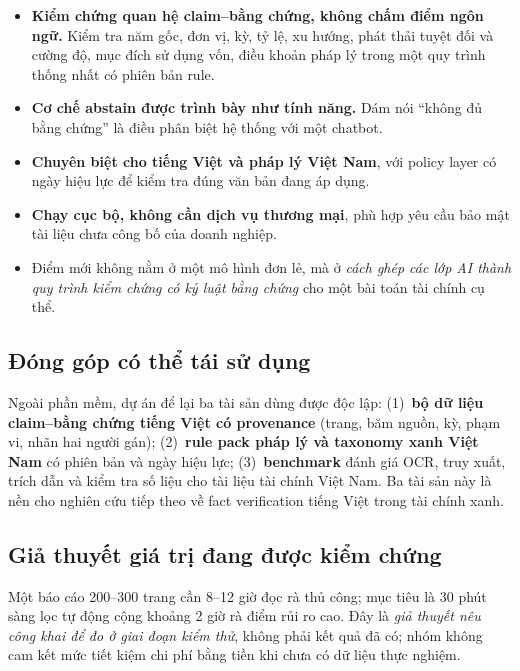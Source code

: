 \documentclass[11pt,a4paper]{article}
\begin{document}
\begin{itemize}
  \item \textbf{Kiểm chứng quan hệ claim--bằng chứng, không chấm điểm ngôn ngữ.} Kiểm tra năm gốc, đơn vị, kỳ, tỷ lệ, xu hướng, phát thải tuyệt đối và cường độ, mục đích sử dụng vốn, điều khoản pháp lý trong một quy trình thống nhất có phiên bản rule.
  \item \textbf{Cơ chế abstain được trình bày như tính năng.} Dám nói ``không đủ bằng chứng'' là điều phân biệt hệ thống với một chatbot.
  \item \textbf{Chuyên biệt cho tiếng Việt và pháp lý Việt Nam}, với policy layer có ngày hiệu lực để kiểm tra đúng văn bản đang áp dụng.
  \item \textbf{Chạy cục bộ, không cần dịch vụ thương mại}, phù hợp yêu cầu bảo mật tài liệu chưa công bố của doanh nghiệp.
  \item Điểm mới không nằm ở một mô hình đơn lẻ, mà ở \emph{cách ghép các lớp AI thành quy trình kiểm chứng có kỷ luật bằng chứng} cho một bài toán tài chính cụ thể.
\end{itemize}

\subsection{Đóng góp có thể tái sử dụng}

Ngoài phần mềm, dự án để lại ba tài sản dùng được độc lập: (1)~\textbf{bộ dữ liệu claim--bằng chứng tiếng Việt có provenance} (trang, băm nguồn, kỳ, phạm vi, nhãn hai người gán); (2)~\textbf{rule pack pháp lý và taxonomy xanh Việt Nam} có phiên bản và ngày hiệu lực; (3)~\textbf{benchmark} đánh giá OCR, truy xuất, trích dẫn và kiểm tra số liệu cho tài liệu tài chính Việt Nam. Ba tài sản này là nền cho nghiên cứu tiếp theo về fact verification tiếng Việt trong tài chính xanh.

\subsection{Giả thuyết giá trị đang được kiểm chứng}

Một báo cáo 200--300 trang cần 8--12 giờ đọc rà thủ công; mục tiêu là 30 phút sàng lọc tự động cộng khoảng 2 giờ rà điểm rủi ro cao. Đây là \emph{giả thuyết nêu công khai để đo ở giai đoạn kiểm thử}, không phải kết quả đã có; nhóm không cam kết mức tiết kiệm chi phí bằng tiền khi chưa có dữ liệu thực nghiệm.

\end{document}
